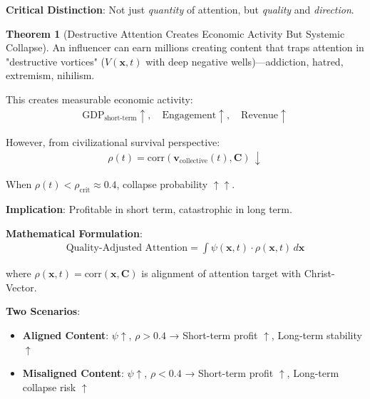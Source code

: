 \documentclass[11pt,a4paper]{article}
\theoremstyle{definition}
\newtheorem{theorem}{Theorem}[section]
\theoremstyle{remark}
\begin{document}
\begin{mdframed}[backgroundcolor=yellow!10,linewidth=2pt]
\textbf{Critical Distinction}: Not just \textit{quantity} of attention, but \textit{quality} and \textit{direction}.

\begin{theorem}[Destructive Attention Creates Economic Activity But Systemic Collapse]
An influencer can earn millions creating content that traps attention in "destructive vortices" (\(V(\mathbf{x}, t)\) with deep negative wells)—addiction, hatred, extremism, nihilism.

This creates measurable economic activity:
\begin{align}
\text{GDP}_{\text{short-term}} \uparrow, \quad \text{Engagement} \uparrow, \quad \text{Revenue} \uparrow
\end{align}

However, from civilizational survival perspective:
\begin{align}
\rho(t) = \text{corr}(\mathbf{v}_{\text{collective}}(t), \mathbf{C}) \, \downarrow
\end{align}

When \(\rho(t) < \rho_{\text{crit}} \approx 0.4\), collapse probability \(\uparrow \uparrow\).

\textbf{Implication}: Profitable in short term, catastrophic in long term.
\end{theorem}

\textbf{Mathematical Formulation}:
\begin{align}
\text{Quality-Adjusted Attention} = \int \psi(\mathbf{x},t) \cdot \rho(\mathbf{x},t) \, d\mathbf{x}
\end{align}

where \(\rho(\mathbf{x},t) = \text{corr}(\mathbf{x}, \mathbf{C})\) is alignment of attention target with Christ-Vector.

\textbf{Two Scenarios}:
\begin{itemize}
    \item \textbf{Aligned Content}: \(\psi \uparrow\), \(\rho > 0.4\) → Short-term profit \(\uparrow\), Long-term stability \(\uparrow\)
    \item \textbf{Misaligned Content}: \(\psi \uparrow\), \(\rho < 0.4\) → Short-term profit \(\uparrow\), Long-term collapse risk \(\uparrow\)
\end{itemize}
\end{mdframed}
\end{document}
